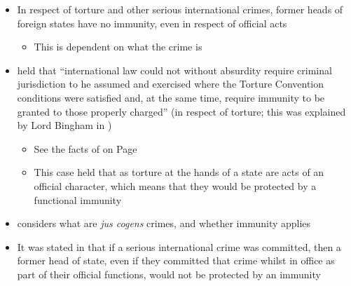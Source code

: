 \begin{itemize}
    \item In respect of torture and other serious international crimes, former heads of foreign states have no immunity, even in respect of official acts
    \begin{itemize}
        \item This is dependent on what the crime is
    \end{itemize}
    \item {} held that ``international law could not without absurdity require criminal jurisdiction to he assumed and exercised where the Torture Convention conditions were satisfied and, at the same time, require immunity to be granted to those properly charged'' (in respect of torture; this was explained by Lord Bingham in )
    \begin{itemize}
        \item See the facts of  on Page \pageref{case:Pinochet (No 3)}
        \item This case held that as torture at the hands of a state are acts of an official character, which means that they would be protected by a functional immunity
    \end{itemize}
    \item {} considers what are \textit{jus cogens} crimes, and whether immunity applies
    \item It was stated in  that if a serious international crime was committed, then a former head of state, even if they committed that crime whilst in office as part of their official functions, would not be protected by an immunity
\end{itemize}

